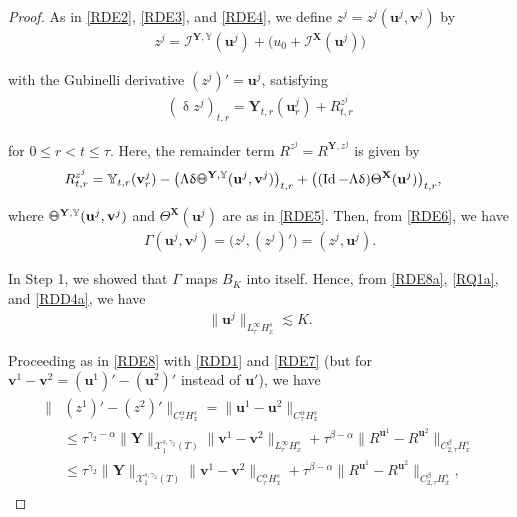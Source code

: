 \documentclass[letterpaper, 11pt,  reqno]{amsart}
\DeclareMathOperator{\Id}{Id}
\newcommand{\1}{\hspace{0.5mm}\textup{I}\hspace{0.5mm}}
\newcommand{\I}{\mathcal{I}}
\newcommand{\noi}{\noindent}
\newcommand{\al}{\alpha}
\newcommand{\be}{\beta}
\newcommand{\updl}{\updelta}
\newcommand{\g}{\gamma}
\newcommand{\G}{\Gamma}
\newcommand{\Ld}{\Lambda}
\newcommand{\les}{\lesssim}
\newcommand{\cX}{\mathcal{X}}
\newcommand{\uu}{\mathbf{u}}
\newcommand{\vv}{\mathbf{v}}
\newcommand{\Ta}{\Theta}
\newcommand{\YYb}{\mathbb{Y}}
\newcommand{\XX}{\mathbf{X}}
\newcommand{\YY}{\mathbf{Y}}
\def\doublestroke#1{\pdfliteral{1 Tr .35 w}#1\pdfliteral{0 Tr 0 w}}
\newcommand{\Taa}{\doublestroke{\Theta}}
\numberwithin{equation}{section}
\numberwithin{theorem}{section}
\begin{document}
\begin{proof}
As in \eqref{RDE2}, \eqref{RDE3}, and \eqref{RDE4}, 
we define 
 $z^j = z^j(\uu^j, \vv^j)$ by 
\begin{align*}
z^j
  = \I^{\YY, \YYb}(\uu^j)
+ \big(u_0 + \I^\XX(\uu^j)\big)
\end{align*}

\noi
 with the Gubinelli derivative $(z^j)' = \uu^j$, 
 satisfying
\begin{align}
(\updl z^j)_{t, r}
= \YY_{t, r} (\uu^j_r) + R^{z^j}_{t, r}
\label{RDD3} 
\end{align}

\noi
for $0 \le r < t \le \tau$.
Here, 
 the remainder term
 $R^{z^j} = R^{\YY, z^j}$ is given by 
\begin{align}
\begin{split}
R^{z^j}_{t, r} 
& = 
\YYb_{t, r} (\vv^j_r)
- \big(\Ld \updl
\Taa^{\YY, \YYb}(\uu^j, \vv^j)\big)_{t, r}
+ \big((\Id - \Ld \updl) \Ta^\XX(\uu^j)\big)_{t, r},
\end{split}
\label{RDD4}
\end{align}

\noi
where
$\Taa^{\YY, \YYb}(\uu^j, \vv^j)$ and 
$\Ta^\XX(\uu^j)$ are as in \eqref{RDE5}.
Then, from \eqref{RDE6}, we have
\begin{align}
\G(\uu^j, \vv^j) = \big(z^j, (z^j)'\big)
= (z^j, \uu^j).
\label{RDD4a}
\end{align}

\noi
In Step 1, we showed that $\G$ maps $B_K$ into itself.
Hence, from 
\eqref{RDE8a}, 
\eqref{RQ1a}, and 
 \eqref{RDD4a}, 
we have 
\begin{align}
\| \uu^j\|_{L^\infty_\tau H^s_x} \les K.
\label{RDD1a}
\end{align}






Proceeding as in \eqref{RDE8} with \eqref{RDD1}  and \eqref{RDE7}
(but for $\vv^1 - \vv^2= (\uu^1)' - (\uu^2)' $ instead of $\uu'$), we have 
\begin{align}
\begin{split}
\| & (z^1)' - (z^2)'\|_{C^\al_\tau H^s_x}
 = \| \uu^1 - \uu^2\|_{C^\al_\tau H^s_x}\\
&  \le \tau^{\g_2 - \al}\| \YY\|_{\cX^{s, \g_2}_1(T)} \|\vv^1 - \vv^2\|_{L^\infty_\tau H^s_x}
+ \tau^{\be - \al}\|  R^{\uu^1} - R^{\uu^2}\|_{C^\be_{2, \tau } H^s_x}\\
& \le  %
 \tau^{\g_2} \| \YY\|_{\cX^{s, \g_2}_1(T)}\|\vv^1 - \vv^2\|_{C^\al_\tau H^s_x}
+ \tau^{\be - \al}\| R^{\uu^1} - R^{\uu^2}\|_{C^\be_{2, \tau } H^s_x}, 
\end{split}
\label{RDD8}
\end{align}






\end{proof}
\end{document}
